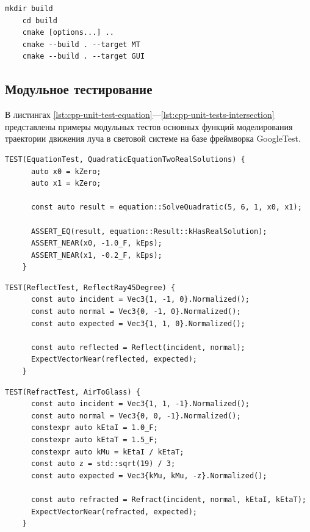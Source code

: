 
\begin{lstlisting}[gobble=8, caption={Сборка\label{lst:cmake}}]
	mkdir build
	cd build
	cmake [options...] ..
	cmake --build . --target MT
	cmake --build . --target GUI
\end{lstlisting}

\begin{FixLineStretch}
\section{Модульное тестирование}
\end{FixLineStretch}

В листингах \ref{lst:cpp-unit-test-equation}—\ref{lst:cpp-unit-tests-intersection} представлены примеры модульных тестов основных функций моделирования траектории движения луча в световой системе на базе фреймворка GoogleTest.

\begin{lstlisting}[gobble=8, caption={Юнит-тест функции решения квадратных уравнений\label{lst:cpp-unit-test-equation}}]
	TEST(EquationTest, QuadraticEquationTwoRealSolutions) {
	  auto x0 = kZero;
	  auto x1 = kZero;

	  const auto result = equation::SolveQuadratic(5, 6, 1, x0, x1);

	  ASSERT_EQ(result, equation::Result::kHasRealSolution);
	  ASSERT_NEAR(x0, -1.0_F, kEps);
	  ASSERT_NEAR(x1, -0.2_F, kEps);
	}
\end{lstlisting}

\begin{lstlisting}[gobble=8, caption={Юнит-тест функции отражения\label{lst:cpp-unit-test-reflection}}]
	TEST(ReflectTest, ReflectRay45Degree) {
	  const auto incident = Vec3{1, -1, 0}.Normalized();
	  const auto normal = Vec3{0, -1, 0}.Normalized();
	  const auto expected = Vec3{1, 1, 0}.Normalized();

	  const auto reflected = Reflect(incident, normal);
	  ExpectVectorNear(reflected, expected);
	}
\end{lstlisting}

\begin{lstlisting}[gobble=8, caption={Юнит-тест функции преломления\label{lst:cpp-unit-test-refraction}}]
	TEST(RefractTest, AirToGlass) {
	  const auto incident = Vec3{1, 1, -1}.Normalized();
	  const auto normal = Vec3{0, 0, -1}.Normalized();
	  constexpr auto kEtaI = 1.0_F;
	  constexpr auto kEtaT = 1.5_F;
	  constexpr auto kMu = kEtaI / kEtaT;
	  const auto z = std::sqrt(19) / 3;
	  const auto expected = Vec3{kMu, kMu, -z}.Normalized();

	  const auto refracted = Refract(incident, normal, kEtaI, kEtaT);
	  ExpectVectorNear(refracted, expected);
	}
\end{lstlisting}

